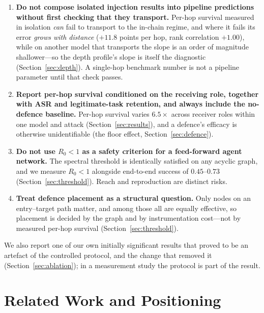 \documentclass[sigconf,anonymous]{aamas}
\begin{document}
\begin{enumerate}
\item \textbf{Do not compose isolated injection results into pipeline
predictions without first checking that they transport.} Per-hop survival measured
in isolation \emph{can} fail to transport to the in-chain regime, and where it fails
its error \emph{grows with distance} ($+11.8$ points per hop, rank correlation
$+1.00$), while on another model that transports the slope is an order of magnitude
shallower---so the depth
profile's slope is itself the diagnostic (Section~\ref{sec:depth}). A single-hop
benchmark number is not a pipeline parameter until that check passes.
\item \textbf{Report per-hop survival conditioned on the receiving role, together
with ASR and legitimate-task retention, and always include the no-defence
baseline.} Per-hop survival varies $6.5\times$ across receiver roles within one
model and attack (Section~\ref{sec:results}), and a defence's efficacy is otherwise
unidentifiable (the floor effect, Section~\ref{sec:defence}).
\item \textbf{Do not use $R_0 < 1$ as a safety criterion for a feed-forward agent
network.} The spectral threshold is identically satisfied on any acyclic graph, and
we measure $R_0 < 1$ alongside end-to-end success of $0.45$--$0.73$
(Section~\ref{sec:threshold}). Reach and reproduction are distinct risks.
\item \textbf{Treat defence placement as a structural question.} Only nodes on an
entry--target path matter, and among those all are equally effective, so placement
is decided by the graph and by instrumentation cost---not by measured per-hop
survival (Section~\ref{sec:threshold}).
\end{enumerate}

We also report one of our own initially significant results that proved to be an
artefact of the controlled protocol, and the change that removed it
(Section~\ref{sec:ablation}); in a measurement study the protocol is part of the
result.


\section{Related Work and Positioning}
\end{document}
